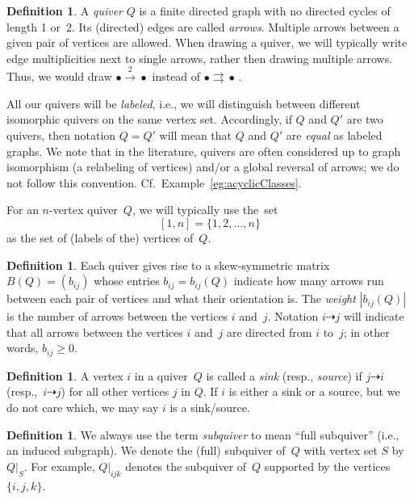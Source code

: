 \documentclass[11pt, letterpaper]{amsart}
\theoremstyle{definition}
\newtheorem{definition}[theorem]{Definition}
\numberwithin{equation}{section}
\newcommand{\points}{\!\dasharrow\!}
\begin{document}
\begin{definition}
\label{def:quiver}
A \emph{quiver} $Q$ is a finite directed graph with no directed cycles of length 1 or~2.
Its (directed) edges are called \emph{arrows}. 
Multiple arrows between a given pair of vertices are allowed. 
When drawing a quiver, we will typically write edge multiplicities next to single arrows,
rather then drawing multiple arrows.
Thus, we would draw $\bullet\!\stackrel{\scriptstyle2}{\longrightarrow}\!\bullet$ instead of 
$\bullet \!\rightrightarrows\! \bullet\,$. 

All our quivers will be \emph{labeled}, i.e., we will distinguish between different isomorphic quivers on the same vertex set. 
Accordingly, if $Q$ and $Q'$ are two quivers, then 
notation $Q = Q'$ will mean that $Q$ and $Q'$ are \emph{equal} as labeled graphs.
We note that in the literature, quivers are often considered up to graph isomorphism (a relabeling of vertices) and/or a global reversal of arrows; we do not follow this convention.
Cf.\ Example~\ref{eg:acyclicClasses}. 

For an $n$-vertex quiver~$Q$, we will typically use the~set 
\[
[1,n]=\{1,2,\dots,n\}
\]
as the set of (labels of the) vertices of~$Q$.  

\end{definition}


\begin{definition}
\label{def:B(Q)}
Each quiver gives rise to a skew-symmetric matrix $B(Q) = (b_{ij})$ 
whose entries $b_{ij}=b_{ij}(Q)$ indicate how many arrows run between each pair of vertices and what their orientation is.
%
The \emph{weight} $|b_{ij}(Q)|$ is the number of arrows between the vertices $i$ and~$j$. 
Notation $i \points j$ will indicate that all arrows between the vertices $i$ and~$j$ 
are directed from $i$ to~$j$; in other words, $b_{ij}\geq 0$. 
\end{definition}

\begin{definition}
A vertex $i$ in a quiver~$Q$ is called a \emph{sink} (resp., \emph{source}) if $j \points i$ (resp.,~$i \points j$) for all other vertices $j$ in $Q$. 
If $i$ is either a sink or a source, but we do not care which, we may say $i$ is a sink/source.
\end{definition}

\begin{definition}
We always use the term \emph{subquiver} to mean ``full subquiver'' (i.e., an induced subgraph). 
We denote the (full) subquiver of~$Q$ with vertex set $S$ by~$Q|_S$.
For example, $Q|_{ijk}$ denotes the subquiver of~$Q$ supported by the vertices~$\{i,j,k\}$. 
\end{definition}
\end{document}
